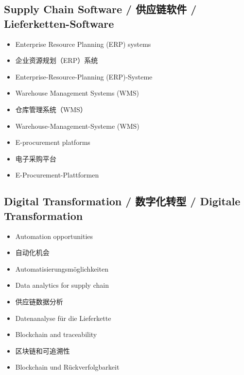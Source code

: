 \subsection{Supply Chain Software / 供应链软件 / Lieferketten-Software}
\begin{itemize}
    \item Enterprise Resource Planning (ERP) systems
    \item 企业资源规划（ERP）系统
    \item Enterprise-Resource-Planning (ERP)-Systeme
    \item Warehouse Management Systems (WMS)
    \item 仓库管理系统（WMS）
    \item Warehouse-Management-Systeme (WMS)
    \item E-procurement platforms
    \item 电子采购平台
    \item E-Procurement-Plattformen
\end{itemize}

\subsection{Digital Transformation / 数字化转型 / Digitale Transformation}
\begin{itemize}
    \item Automation opportunities
    \item 自动化机会
    \item Automatisierungsmöglichkeiten
    \item Data analytics for supply chain
    \item 供应链数据分析
    \item Datenanalyse für die Lieferkette
    \item Blockchain and traceability
    \item 区块链和可追溯性
    \item Blockchain und Rückverfolgbarkeit
\end{itemize}
